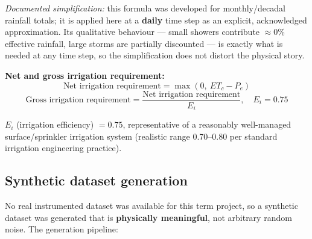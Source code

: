 \documentclass[11pt,a4paper]{article}
\begin{document}
\emph{Documented simplification:} this formula was developed for
monthly/decadal rainfall totals; it is applied here at a \textbf{daily} time
step as an explicit, acknowledged approximation. Its qualitative behaviour ---
small showers contribute $\approx$0\% effective rainfall, large storms are
partially discounted --- is exactly what is needed at any time step, so the
simplification does not distort the physical story.

\textbf{Net and gross irrigation requirement:}
\begin{equation}
\text{Net irrigation requirement} = \max(0,\ ET_c - P_e)
\label{eq:net}
\end{equation}
\begin{equation}
\text{Gross irrigation requirement} = \frac{\text{Net irrigation requirement}}{E_i}, \quad E_i = 0.75
\label{eq:gross}
\end{equation}

$E_i$ (irrigation efficiency) $= 0.75$, representative of a reasonably
well-managed surface/sprinkler irrigation system (realistic range 0.70--0.80
per standard irrigation engineering practice).

\subsection{Synthetic dataset generation}

No real instrumented dataset was available for this term project, so a
synthetic dataset was generated that is \textbf{physically meaningful}, not
arbitrary random noise. The generation pipeline:
\end{document}
